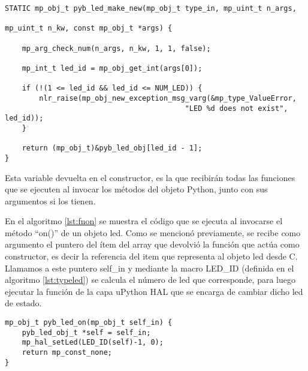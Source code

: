 \begin{lstlisting}[label={lst:constructor},caption=Definición de la función constructor.] 
STATIC mp_obj_t pyb_led_make_new(mp_obj_t type_in, mp_uint_t n_args, 
																 mp_uint_t n_kw, const mp_obj_t *args) {
																
    mp_arg_check_num(n_args, n_kw, 1, 1, false);
		
    mp_int_t led_id = mp_obj_get_int(args[0]);
		
    if (!(1 <= led_id && led_id <= NUM_LED)) {
        nlr_raise(mp_obj_new_exception_msg_varg(&mp_type_ValueError,
				                          "LED %d does not exist", led_id));
    }
		
    return (mp_obj_t)&pyb_led_obj[led_id - 1];
}
\end{lstlisting}

Esta variable devuelta en el constructor, es la que recibirán todas las funciones que se ejecuten al invocar los métodos del objeto Python, junto con sus argumentos si los tienen.

En el algoritmo \ref{lst:fnon} se muestra el código que se ejecuta al invocarse el método “on()” de un objeto led. Como se mencionó previamente, se recibe como argumento el puntero del ítem del array que devolvió la función que actúa como constructor, es decir la referencia del item que representa al objeto led desde C. Llamamos a este puntero self\_in y mediante la macro LED\_ID (definida en el algoritmo \ref{lst:typeled}) se calcula el número de led que corresponde, para luego ejecutar la función de la capa uPython HAL que se encarga de cambiar dicho led de estado.

\begin{lstlisting}[label={lst:fnon},caption=Definición de la función que se ejecuta al invocar el método on().] 
mp_obj_t pyb_led_on(mp_obj_t self_in) {
    pyb_led_obj_t *self = self_in;
    mp_hal_setLed(LED_ID(self)-1, 0);
    return mp_const_none;
}
\end{lstlisting}






